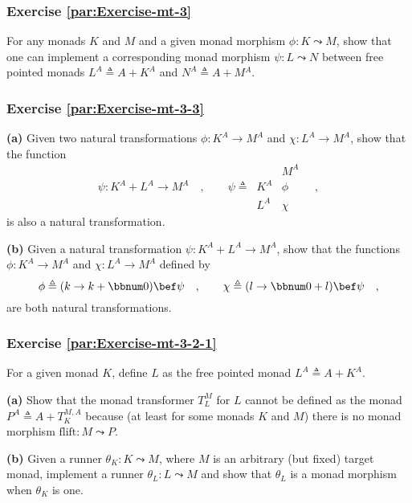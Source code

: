 \subsubsection{Exercise \label{par:Exercise-mt-3}\ref{par:Exercise-mt-3}}

For any monads $K$ and $M$ and a given monad morphism $\phi:K\leadsto M$,
show that one can implement a corresponding monad morphism $\psi:L\leadsto N$
between free pointed monads $L^{A}\triangleq A+K^{A}$ and $N^{A}\triangleq A+M{}^{A}$.

\subsubsection{Exercise \label{par:Exercise-mt-3-3}\ref{par:Exercise-mt-3-3}}

\textbf{(a)} Given two natural transformations $\phi:K^{A}\rightarrow M^{A}$
and $\chi:L^{A}\rightarrow M^{A}$, show that the function 
\[
\psi:K^{A}+L^{A}\rightarrow M^{A}\quad,\quad\quad\psi\triangleq\,\begin{array}{|c||c|}
 & M^{A}\\
\hline K^{A} & \phi\\
L^{A} & \chi
\end{array}\quad,
\]
 is also a natural transformation.

\textbf{(b)} Given a natural transformation $\psi:K^{A}+L^{A}\rightarrow M^{A}$,
show that the functions $\phi:K^{A}\rightarrow M^{A}$ and $\chi:L^{A}\rightarrow M^{A}$
defined by
\[
\phi\triangleq(k\rightarrow k+\bbnum 0)\bef\psi\quad,\quad\quad\chi\triangleq(l\rightarrow\bbnum 0+l)\bef\psi\quad,
\]
are both natural transformations.

\subsubsection{Exercise \label{par:Exercise-mt-3-2-1}\ref{par:Exercise-mt-3-2-1}}

For a given monad $K$, define $L$ as the free pointed monad $L^{A}\triangleq A+K^{A}$. 

\textbf{(a)} Show that the monad transformer $T_{L}^{M}$ for $L$
cannot be defined as the monad $P^{A}\triangleq A+T_{K}^{M,A}$ because
(at least for some monads $K$ and $M$) there is no monad morphism
$\text{flift}:M\leadsto P$.

\textbf{(b)} Given a runner $\theta_{K}:K\leadsto M$, where $M$
is an arbitrary (but fixed) target monad, implement a runner $\theta_{L}:L\leadsto M$
and show that $\theta_{L}$ is a monad morphism when $\theta_{K}$
is one.

